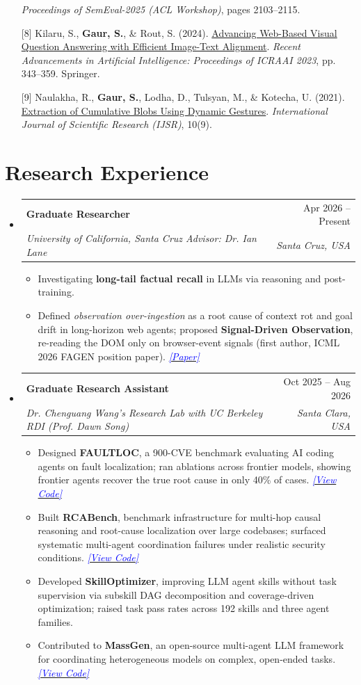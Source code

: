 \documentclass[letterpaper,11pt]{article}
\makeatletter
\newcommand{\resumeItem}[1]{
  \item{
    {#1 \vspace{-4pt}}
  }
}
\newcommand{\resumeSubheading}[4]{
  \vspace{-2pt}\item
    \begin{tabular*}{0.97\textwidth}[t]{l@{\extracolsep{\fill}}r}
      \textbf{#1} & #2 \\
      \textit{\small #3} & \textit{\small #4} \\
    \end{tabular*}\vspace{-10pt}
}
\newcommand{\resumeSubHeadingListStart}{\begin{itemize}[leftmargin=0.15in, label={}]}
\newcommand{\resumeSubHeadingListEnd}{\end{itemize}}
\newcommand{\resumeItemListStart}{\begin{itemize}}
\newcommand{\resumeItemListEnd}{\end{itemize}\vspace{-2pt}}
\newcommand{\codelink}[1]{\href{#1}{\textcolor{blue}{\textit{[View Code]}}}}
\newcommand{\paperlink}[2]{\href{#1}{\textcolor{blue}{\textit{[#2]}}}}
\makeatother
\begin{document}
\begin{itemize}[leftmargin=0.25in, labelsep=0.08in]
  \textit{Proceedings of SemEval-2025 (ACL Workshop)}, pages 2103--2115.
  \item[{[8]}] Kilaru, S., \textbf{Gaur, S.}, \& Rout, S. (2024).
  \href{https://link.springer.com/chapter/10.1007/978-981-97-1111-6_28}{Advancing Web-Based Visual Question Answering with Efficient Image-Text Alignment}.
  \textit{Recent Advancements in Artificial Intelligence: Proceedings of ICRAAI 2023}, pp. 343--359. Springer.
  \item[{[9]}] Naulakha, R., \textbf{Gaur, S.}, Lodha, D., Tulsyan, M., \& Kotecha, U. (2021).
  \href{https://arxiv.org/abs/2501.04002}{Extraction of Cumulative Blobs Using Dynamic Gestures}.
  \textit{International Journal of Scientific Research (IJSR)}, 10(9).
\end{itemize}

\section{Research Experience}
\resumeSubHeadingListStart

\resumeSubheading
  {Graduate Researcher}{Apr 2026 -- Present}
  {University of California, Santa Cruz \textbullet{} Advisor: Dr. Ian Lane}{Santa Cruz, USA}
  \resumeItemListStart
    \small
    \resumeItem{Investigating \textbf{long-tail factual recall} in LLMs via reasoning and post-training.}
    \resumeItem{Defined \textit{observation over-ingestion} as a root cause of context rot and goal drift in long-horizon web agents; proposed \textbf{Signal-Driven Observation}, re-reading the DOM only on browser-event signals (first author, ICML 2026 FAGEN position paper). \paperlink{https://arxiv.org/abs/2606.06708}{Paper}}
  \resumeItemListEnd
\resumeSubHeadingListEnd

\resumeSubHeadingListStart
\resumeSubheading
  {Graduate Research Assistant}{Oct 2025 -- Aug 2026}
  {Dr. Chenguang Wang's Research Lab \textbullet{} with UC Berkeley RDI (Prof. Dawn Song)}{Santa Clara, USA}
  \resumeItemListStart
    \small
    \resumeItem{Designed \textbf{FAULTLOC}, a 900-CVE benchmark evaluating AI coding agents on fault localization; ran ablations across frontier models, showing frontier agents recover the true root cause in only 40\% of cases. \codelink{https://github.com/JianhongTu/FLBench}}
    \resumeItem{Built \textbf{RCABench}, benchmark infrastructure for multi-hop causal reasoning and root-cause localization over large codebases; surfaced systematic multi-agent coordination failures under realistic security conditions. \codelink{https://github.com/wang-research-lab/RCAbench}}
    \resumeItem{Developed \textbf{SkillOptimizer}, improving LLM agent skills without task supervision via subskill DAG decomposition and coverage-driven optimization; raised task pass rates across 192 skills and three agent families.}
    \resumeItem{Contributed to \textbf{MassGen}, an open-source multi-agent LLM framework for coordinating heterogeneous models on complex, open-ended tasks. \codelink{https://github.com/massgen/MassGen}}
  \resumeItemListEnd
\resumeSubHeadingListEnd
\end{document}
